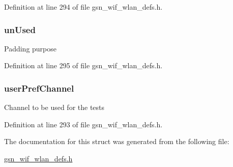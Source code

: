 Definition at line 294 of file gsn\_\-wif\_\-wlan\_\-defs.h.

\hypertarget{a00188_a883f58cff3367939239f80a88fc1cff1}{
\subsubsection[{unUsed}]{ {\bf unUsed}}}
\label{a00188_a883f58cff3367939239f80a88fc1cff1}
Padding purpose 

Definition at line 295 of file gsn\_\-wif\_\-wlan\_\-defs.h.

\hypertarget{a00188_aff6f6c2e6a123699448a2850aca96f87}{
\subsubsection[{userPrefChannel}]{ {\bf userPrefChannel}}}
\label{a00188_aff6f6c2e6a123699448a2850aca96f87}
Channel to be used for the tests 

Definition at line 293 of file gsn\_\-wif\_\-wlan\_\-defs.h.



The documentation for this struct was generated from the following file:\begin{DoxyCompactItemize}
\item 
\hyperlink{a00613}{gsn\_\-wif\_\-wlan\_\-defs.h}\end{DoxyCompactItemize}
